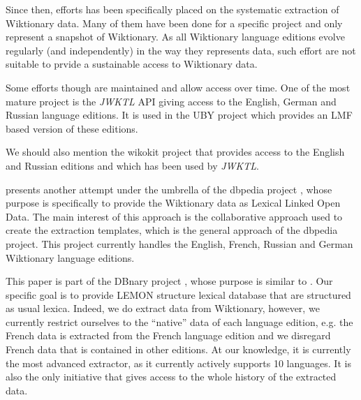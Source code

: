 \documentclass[10pt, a4paper]{article}
\begin{document}
Since then, efforts has been specifically placed on the systematic extraction of Wiktionary data. Many of them have been done for a specific project and only represent a snapshot of Wiktionary. As all Wiktionary language editions evolve regularly (and independently) in the way they represents data, such effort are not suitable to prvide a sustainable access to Wiktionary data. 

Some efforts though are maintained and allow access over time. One of the most mature project is the \emph{JWKTL} API \cite{ZeschMuellerGurevych2008} giving access to  the English, German and Russian language editions. It is used in the UBY project \cite{gurevych2012uby} which provides an LMF based version of these editions. 

We should also mention the wikokit project \cite{krizhanovsky2010transformation} that provides access to the English and Russian editions and which has been used by \emph{JWKTL}.

\cite{HellmannSebastianandBrekleJonasandAuer} presents another attempt under the umbrella of the dbpedia project \cite{dbpedia-swj}, whose purpose is specifically to provide the Wiktionary data as Lexical Linked Open Data. The main interest of this approach is the collaborative approach used to create the extraction templates, which is the general approach of the dbpedia project. This project currently handles the English, French, Russian and German Wiktionary language editions.

This paper is part of the DBnary project \cite{serasset:dbnary-swj}, whose purpose is similar to \cite{HellmannSebastianandBrekleJonasandAuer}. Our specific goal is to provide LEMON structure lexical database that are structured as usual lexica. Indeed, we do extract data from Wiktionary, however, we currently restrict ourselves to the ``native'' data of each language edition, e.g. the French data is extracted from the French language edition and we disregard French data that is contained in other editions. At our knowledge, it is currently the most advanced extractor, as it currently actively supports 10 languages. It is also the only initiative that gives access to the whole history of the extracted data.
\end{document}
